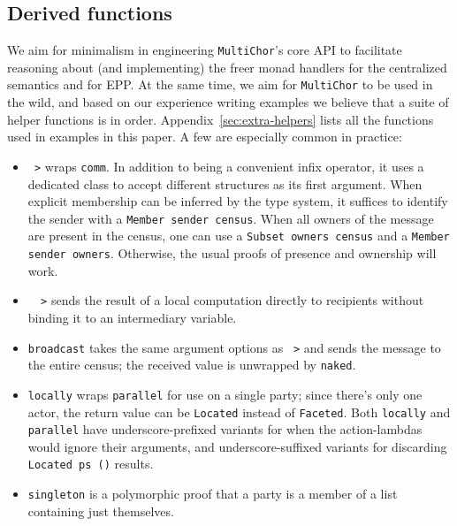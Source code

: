 \documentclass[sigplan,screen]{acmart}
\newcommand{\inlinecode}[2][haskell]{\texttt{#2}}
\newcommand{\MultiChor}{\texttt{Multi\-Chor}\xspace}
\begin{document}
\subsection{Derived functions}\label{sec:helpers}
We aim for minimalism in engineering \MultiChor's core API to facilitate reasoning about
(and implementing) the freer monad handlers for the centralized semantics and for EPP.
At the same time, we aim for \MultiChor to be used in the wild,
and based on our experience writing examples
we believe that a suite of helper functions is in order.
Appendix~\ref{sec:extra-helpers} lists all the functions used in examples in this paper.
A few are especially common in practice:
\begin{itemize}[leftmargin=12pt, topsep=2pt]
    \item \inlinecode{~>} wraps \inlinecode{comm}.
          In addition to being a convenient infix operator,
          it uses a dedicated class to accept different structures as its first argument.
          When explicit membership can be inferred by the type system,
          it suffices to identify the sender with a \inlinecode{Member sender census}.
          When all owners of the message are present in the census,
          one can use a \inlinecode{Subset owners census} and a \inlinecode{Member sender owners}.
          Otherwise, the usual proofs of presence and ownership will work.
    \item \inlinecode{~~>} sends the result of a local computation directly to recipients
          without binding it to an intermediary variable.
    \item \inlinecode{broadcast} takes the same argument options as \inlinecode{~>}
          and sends the message to the entire census;
          the received value is unwrapped by \inlinecode{naked}.
    \item \inlinecode{locally} wraps \inlinecode{parallel} for use on a single party;
          since there's only one actor, the return value can be \inlinecode{Located}
          instead of \inlinecode{Faceted}.
          Both \inlinecode{locally} and \inlinecode{parallel} have underscore-prefixed
          variants for when the action-lambdas would ignore their arguments,
          and underscore-suffixed variants for discarding \inlinecode{Located ps ()} results.
    \item \inlinecode{singleton} is a polymorphic proof that a party is a member of a list
          containing just themselves. 
\end{itemize}
\end{document}
